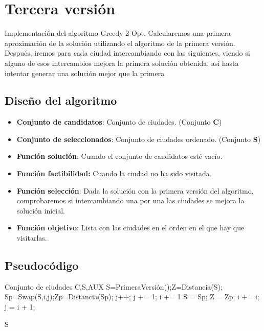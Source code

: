 	
	\section{Tercera versión} 
	
		Implementación del algoritmo Greedy 2-Opt. Calcularemos una primera aproximación de la solución utilizando el algoritmo de la primera versión. Después, iremos para cada ciudad intercambiando con las siguientes, viendo si alguno de esos intercambios mejora la primera solución obtenida, así hasta intentar generar una solución mejor que la primera
		
	\subsection{Diseño del algoritmo} 
	
		\begin{itemize}
			\item \textbf{Conjunto de candidatos}: Conjunto de ciudades. (Conjunto \textbf{C})
			\item \textbf{Conjunto de seleccionados}: Conjunto de ciudades ordenado. (Conjunto \textbf{S})
			\item \textbf{Función solución}: Cuando el conjunto de candidatos esté vacío.
			\item \textbf{Función factibilidad:} Cuando la ciudad no ha sido visitada.
			\item \textbf{Función selección}: Dada la solución con la primera versión del algoritmo, comprobaremos si intercambiando una por una las ciudades se mejora la solución inicial.
			\item \textbf{Función objetivo}: Lista con las ciudades en el orden en el que hay que visitarlas.		
		\end{itemize}
		
		
	\subsection{Pseudocódigo}

		\begin{algorithmic}				
			\Require Conjunto de ciudades C,S,AUX
			\State S=PrimeraVersión();Z=Distancia(S);
			\State Sp=Swap(S,i,j);Zp=Distancia(Sp);
			\State j++;
			\EndIf
			\State j += 1; i += 1
			\EndIf
			\State S = Sp; Z = Zp;
			\State i += i; j = i + 1;
			\EndIf
			\EndWhile  
			
			\Return S	
			
			
			
		\end{algorithmic}
		

